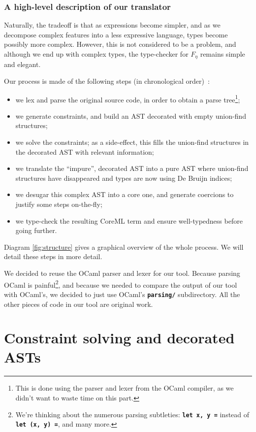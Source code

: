 \documentclass[10pt,a4paper,twoside,titlepage,twocolumn]{article}
\newcommand{\code}[1]{\textbf{\texttt{#1}}}
\begin{document}
\section{A high-level description of our translator}

Naturally, the tradeoff is that as expressions become simpler, and as we
decompose complex features into a less expressive language, types become
possibly more complex. However, this is not considered to be a problem, and
although we end up with complex types, the type-checker for $F_\eta$ remains
simple and elegant.

Our process is made of the following steps (in chronological order)~:
\begin{itemize}
  \item we lex and parse the original source code, in order to obtain a parse
    tree\footnote{This is done using the parser and lexer from the OCaml
    compiler, as we didn't want to waste time on this part.};
  \item we generate constraints, and build an AST decorated with empty
    union-find structures;
  \item we solve the constraints; as a side-effect, this fills the union-find
    structures in the decorated AST with relevant information;
  \item we translate the ``impure'', decorated AST into a pure AST where
    union-find structures have disappeared and types are now using De Bruijn
    indices;
  \item we desugar this complex AST into a core one, and generate coercions to
    justify some steps on-the-fly;
  \item we type-check the resulting CoreML term and ensure well-typedness before
    going further.
\end{itemize}

Diagram \vref{fig:structure} gives a graphical overview of the whole process. We
will detail these steps in more detail.

We decided to reuse the OCaml parser and lexer for our tool. Because parsing
OCaml is painful\footnote{We're thinking about the numerous parsing subtleties:
\code{let x, y =} instead of \code{let (x, y) =}, and many more.}, and because
we needed to compare the output of our tool with OCaml's, we decided to just use
OCaml's \code{parsing/} subdirectory. All the other pieces of code in our tool
are original work.

\part[1]{Constraint solving and decorated ASTs}
\end{document}
